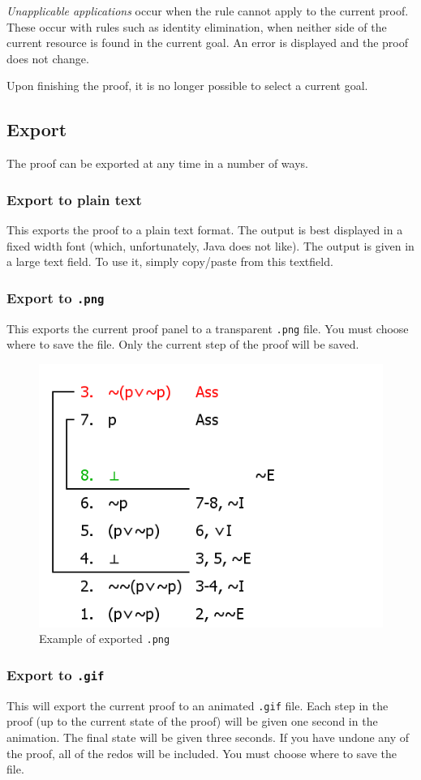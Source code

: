 \documentclass[a4paper]{article}
\begin{document}
\emph{Unapplicable applications} occur when the rule cannot apply to the current proof. These occur with rules such as identity elimination, when neither side of the current resource is found in the current goal. An error is displayed and the proof does not change.

Upon finishing the proof, it is no longer possible to select a current goal.

\subsection{Export}
The proof can be exported at any time in a number of ways.

\subsubsection{Export to plain text}
This exports the proof to a plain text format. The output is best displayed in a fixed width font (which, unfortunately, Java does not like). The output is given in a large text field. To use it, simply copy/paste from this textfield.

\subsubsection{Export to \texttt{.png}}
This exports the current proof panel to a transparent \texttt{.png} file. You must choose where to save the file. Only the current step of the proof will be saved.

\begin{figure}
	\centering
		\includegraphics[width=.50\textwidth]{images/save.png}
	\caption{Example of exported \texttt{.png}}
	\label{fig:save}
\end{figure}


\subsubsection{Export to \texttt{.gif}}
This will export the current proof to an animated \texttt{.gif} file. Each step in the proof (up to the current state of the proof) will be given one second in the animation. The final state will be given three seconds. If you have undone any of the proof, all of the redos will be included. You must choose where to save the file.
\end{document}
